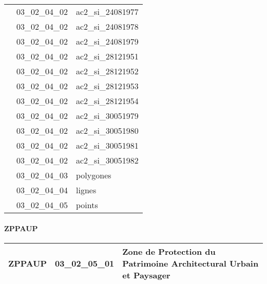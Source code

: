 \documentclass[12pt,titlepage]{book}
\begin{document}
\begin{supertabular}{|p{10cm}|c|p{15cm}|}
                    & 03\_02\_04\_02 & ac2\_si\_24081977\\


                    & 03\_02\_04\_02 & ac2\_si\_24081978\\


                    & 03\_02\_04\_02 & ac2\_si\_24081979\\


                    & 03\_02\_04\_02 & ac2\_si\_28121951\\


                    & 03\_02\_04\_02 & ac2\_si\_28121952\\


                    & 03\_02\_04\_02 & ac2\_si\_28121953\\


                    & 03\_02\_04\_02 & ac2\_si\_28121954\\


                    & 03\_02\_04\_02 & ac2\_si\_30051979\\


                    & 03\_02\_04\_02 & ac2\_si\_30051980\\


                    & 03\_02\_04\_02 & ac2\_si\_30051981\\


                    & 03\_02\_04\_02 & ac2\_si\_30051982\\


                    & 03\_02\_04\_03 & polygones\\


                    & 03\_02\_04\_04 & lignes\\


                    & 03\_02\_04\_05 & points\\
\hline
\end{supertabular}


\paragraph{ZPPAUP}
\noindent
\vspace{\baselineskip}

\renewcommand{\arraystretch}{1.2}
\begin{supertabular}{|p{10cm}|c|p{15cm}|}
 ZPPAUP & 03\_02\_05\_01 & Zone de Protection du Patrimoine Architectural Urbain et Paysager\\
\hline
\end{supertabular}
\end{document}
